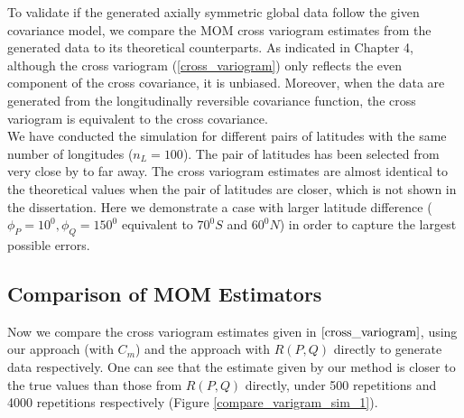 
%
%

To validate if the generated axially symmetric global data follow the given covariance model, we compare the MOM cross variogram estimates from the generated data to its theoretical counterparts. As indicated in Chapter 4, although the cross variogram (\ref{cross_variogram}) only reflects the even component of the cross covariance, it is unbiased. Moreover, when the data are generated from the longitudinally reversible covariance function, the cross variogram is equivalent to the cross covariance. \\

We have conducted the simulation for different pairs of latitudes with the same number of longitudes ($n_L = 100$). The pair of latitudes has been selected from very close by to far away. The cross variogram estimates are almost identical to the theoretical values when the pair of latitudes are closer, which is not shown in the dissertation. Here we demonstrate a case with larger latitude difference ($\phi_P = 10^0, \phi_Q = 150^0$ equivalent to $70^0S$ and $60^0N$) in order to capture the largest possible errors. 


\vskip 24pt

\subsection{Comparison of MOM Estimators}

Now we compare the cross variogram estimates given in $\eqref{cross_variogram}$, using our approach (with $C_m$) and the approach with $R(P,Q)$ directly to generate data respectively. One can see that the estimate given by our method is closer to the true values than those from $R(P, Q)$ directly, under 500 repetitions and 4000 repetitions respectively (Figure \ref{compare_varigram_sim_1}).

